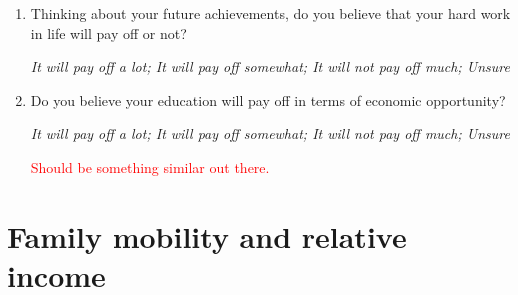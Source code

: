 \documentclass[11pt, headsepline]{article}
\newcommand{\blue}[1]{\textcolor{blue}{#1}}
\newcommand{\red}[1]{\textcolor{red}{#1}}
\begin{document}
\begin{enumerate}[resume]
    \blue{GSS: ``Some people say that people get ahead by their own hard work; others say that lucky breaks or help from other people are more important. Which do you think is most important?''}

    \blue{GSS: ``For each of these, please tell me how important it is for getting ahead in life: \textit{How important is hard work?}}

    \blue{GSS: ``Some people say that people get ahead by their own hard work; others say that lucky breaks or help from other people are more important. Which do you think is most important?''}

    \item Thinking about your future achievements, do you believe that your hard work in life will pay off or not?

    \textit{It will pay off a lot; It will pay off somewhat; It will not pay off much; Unsure}

    \item Do you believe your education will pay off in terms of economic opportunity?

    \textit{It will pay off a lot; It will pay off somewhat; It will not pay off much; Unsure}

    \red{Should be something similar out there.}
    
\end{enumerate}

\section*{Family mobility and relative income}
\end{document}
